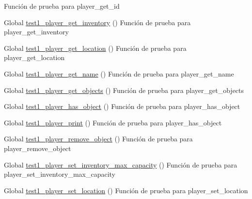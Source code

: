 \begin{DoxyRefList}
%
Función de prueba para player\+\_\+get\+\_\+id  
\item[Global \mbox{\hyperlink{player__test_8c_ad4a86b57bc18593265c205d7b27b9ecb}{test1\+\_\+player\+\_\+get\+\_\+inventory}} ()]\label{test__test000201}%
%
Función de prueba para player\+\_\+get\+\_\+inventory  
\item[Global \mbox{\hyperlink{player__test_8c_a408a557a0cff748c10fb9a03445af191}{test1\+\_\+player\+\_\+get\+\_\+location}} ()]\label{test__test000196}%
%
Función de prueba para player\+\_\+get\+\_\+location  
\item[Global \mbox{\hyperlink{player__test_8c_a94068667d8faa66a4ad293dd2c60f2ef}{test1\+\_\+player\+\_\+get\+\_\+name}} ()]\label{test__test000180}%
%
Función de prueba para player\+\_\+get\+\_\+name  
\item[Global \mbox{\hyperlink{player__test_8c_acbc756696bb48f1c106563b79e867693}{test1\+\_\+player\+\_\+get\+\_\+objects}} ()]\label{test__test000185}%
%
Función de prueba para player\+\_\+get\+\_\+objects  
\item[Global \mbox{\hyperlink{player__test_8c_abedc0e75ebffb4e7224f5e5ac0ee3055}{test1\+\_\+player\+\_\+has\+\_\+object}} ()]\label{test__test000198}%
%
Función de prueba para player\+\_\+has\+\_\+object  
\item[Global \mbox{\hyperlink{player__test_8c_a7783d860e6e5f7c28befc5d2d30af08b}{test1\+\_\+player\+\_\+print}} ()]\label{test__test000206}%
%
Función de prueba para player\+\_\+has\+\_\+object  
\item[Global \mbox{\hyperlink{player__test_8c_a0685839b423f685dcdabb7b9fe411cd1}{test1\+\_\+player\+\_\+remove\+\_\+object}} ()]\label{test__test000190}%
%
Función de prueba para player\+\_\+remove\+\_\+object  
\item[Global \mbox{\hyperlink{player__test_8c_aed1d8026a0c56c42a1a9d89b887a5e4d}{test1\+\_\+player\+\_\+set\+\_\+inventory\+\_\+max\+\_\+capacity}} ()]\label{test__test000203}%
%
Función de prueba para player\+\_\+set\+\_\+inventory\+\_\+max\+\_\+capacity  
\item[Global \mbox{\hyperlink{player__test_8c_aec6799a4f46c3f3c471fcb668addcad4}{test1\+\_\+player\+\_\+set\+\_\+location}} ()]\label{test__test000193}%
%
Función de prueba para player\+\_\+set\+\_\+location  

\end{DoxyRefList}
